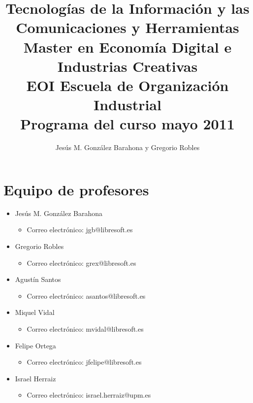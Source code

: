 \documentclass[a4paper,12pt]{article}
\title{Tecnologías de la Información y las Comunicaciones y Herramientas \\
Master en Economía Digital e Industrias Creativas \\
EOI Escuela de Organización Industrial \\
Programa del curso mayo 2011}
\author{Jesús M. González Barahona y Gregorio Robles}
\begin{document}
\maketitle

\newpage

\tableofcontents

\newpage

\section{Equipo de profesores}

\begin{itemize}
\item Jesús M. González Barahona
  \begin{itemize}
  \item Correo electrónico: jgb@libresoft.es
  \end{itemize}
\item Gregorio Robles
  \begin{itemize}
  \item Correo electrónico: grex@libresoft.es
  \end{itemize}
\item Agustín Santos
  \begin{itemize}
  \item Correo electrónico: asantos@libresoft.es
  \end{itemize}
\item Miquel Vidal
  \begin{itemize}
  \item Correo electrónico: mvidal@libresoft.es
  \end{itemize}
\item Felipe Ortega
  \begin{itemize}
  \item Correo electrónico: jfelipe@libresoft.es
  \end{itemize}
\item Israel Herraiz
  \begin{itemize}
  \item Correo electrónico: israel.herraiz@upm.es
  \end{itemize}
\end{itemize}

\end{document}
